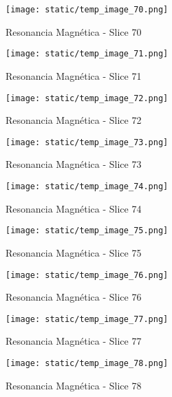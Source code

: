 \documentclass[12pt,a4paper]{article}%
\begin{document}
%


\begin{figure}[H]%
\centering%
\texttt{[image: static/temp\_image\_70.png]}%
\caption{Resonancia Magnética {-} Slice 70}%
\end{figure}

%


\begin{figure}[H]%
\centering%
\texttt{[image: static/temp\_image\_71.png]}%
\caption{Resonancia Magnética {-} Slice 71}%
\end{figure}

%


\begin{figure}[H]%
\centering%
\texttt{[image: static/temp\_image\_72.png]}%
\caption{Resonancia Magnética {-} Slice 72}%
\end{figure}

%


\begin{figure}[H]%
\centering%
\texttt{[image: static/temp\_image\_73.png]}%
\caption{Resonancia Magnética {-} Slice 73}%
\end{figure}

%


\begin{figure}[H]%
\centering%
\texttt{[image: static/temp\_image\_74.png]}%
\caption{Resonancia Magnética {-} Slice 74}%
\end{figure}

%


\begin{figure}[H]%
\centering%
\texttt{[image: static/temp\_image\_75.png]}%
\caption{Resonancia Magnética {-} Slice 75}%
\end{figure}

%


\begin{figure}[H]%
\centering%
\texttt{[image: static/temp\_image\_76.png]}%
\caption{Resonancia Magnética {-} Slice 76}%
\end{figure}

%


\begin{figure}[H]%
\centering%
\texttt{[image: static/temp\_image\_77.png]}%
\caption{Resonancia Magnética {-} Slice 77}%
\end{figure}

%


\begin{figure}[H]%
\centering%
\texttt{[image: static/temp\_image\_78.png]}%
\caption{Resonancia Magnética {-} Slice 78}%
\end{figure}
\end{document}
